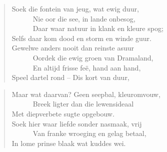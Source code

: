 \begin{verse}
Soek die fontein van jeug, wat ewig duur, \\ 
\ \ \ \ \ \ Nie oor die see, in lande onbesog, \\ 
\ \ \ \ \ \ Daar waar natuur in klank en kleure spog; \\ 
Selfs daar kom dood en storm en winde guur. \\ 
Gewelwe anders nooit dan reinste asuur \\ 
\ \ \ \ \ \ Oordek die ewig groen van Dramaland, \\ 
\ \ \ \ \ \ En altijd frisse fe\"e, hand aan hand, \\ 
Speel dartel rond -- Dis kort van duur, \\ 
\end{verse}

\begin{verse}
Maar wat daarvan? Geen seepbal, kleuromvouw, \\ 
\ \ \ \ \ \ Breek ligter dan die lewensideaal \\ 
Met diepverbete sugte opgebouw. \\ 
Soek hier waar liefde sonder nasmaak, vrij \\ 
\ \ \ \ \ \ Van franke wroeging en gelag betaal, \\ 
In lome prinse blaak wat kuddes wei. \\ 
\end{verse}